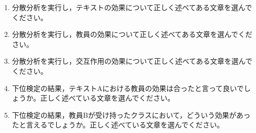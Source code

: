 \begin{enumerate}
	\item 分散分析を実行し，テキストの効果について正しく述べてある文章を選んでください。
	\item 分散分析を実行し，教員の効果について正しく述べてある文章を選んでください。
	\item 分散分析を実行し，交互作用の効果について正しく述べてある文章を選んでください。
	\item 下位検定の結果，テキストAにおける教員の効果は合ったと言って良いでしょうか。正しく述べている文章を選んでください。
	\item 下位検定の結果，教員Bが受け持ったクラスにおいて，どういう効果があったと言えるでしょうか。正しく述べている文章を選んでください。
\end{enumerate}
